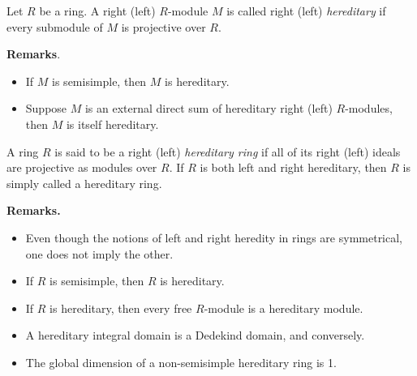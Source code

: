 \documentclass[12pt]{article}
\begin{document}

Let $R$ be a ring.  A right (left) $R$-module $M$ is called right (left) \emph{hereditary} if every submodule of $M$ is projective over $R$.

\textbf{Remarks}.  
\begin{itemize}
\item If $M$ is semisimple, then $M$ is hereditary.
\item Suppose $M$ is an external direct sum of hereditary right (left) $R$-modules, then $M$ is itself hereditary.
\end{itemize}

A ring $R$ is said to be a right (left) \emph{hereditary ring} if all of its right (left) ideals are projective as modules over $R$.  If $R$ is both left and right hereditary, then $R$ is simply called a hereditary ring.

\textbf{Remarks.}
\begin{itemize}
\item Even though the notions of left and right heredity in rings are symmetrical, one does not imply the other.
\item If $R$ is semisimple, then $R$ is hereditary.
\item If $R$ is hereditary, then every free $R$-module is a hereditary module.
\item A hereditary integral domain is a Dedekind domain, and conversely.
\item The global dimension of a non-semisimple hereditary ring is 1.
\end{itemize}
\end{document}
